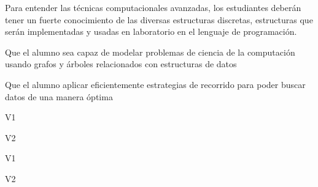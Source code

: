 \begin{syllabus}


\begin{justification}
Para entender las técnicas computacionales avanzadas, los estudiantes deberán tener un fuerte conocimiento de las
diversas estructuras discretas, estructuras que serán implementadas y usadas en laboratorio en el lenguaje de programación.
\end{justification}

\begin{goals}
\item Que el alumno sea capaz de modelar problemas de ciencia de la computación usando grafos y árboles relacionados con estructuras de datos
\item Que el alumno aplicar eficientemente estrategias de recorrido para poder buscar datos de una manera óptima
\end{goals}

\begin{outcomes}{V1}
    \item {}
    \item {}	
    \item {}
\end{outcomes}

\begin{outcomes}{V2}
    \item {}
    \item {}	
    \item {}
\end{outcomes}

\begin{competences}{V1}
    \item {}
    \item {}
    \item {}
\end{competences}

\begin{competences}{V2}
    \item {}
    \item {}
    \item {}
\end{competences}


\end{syllabus}
